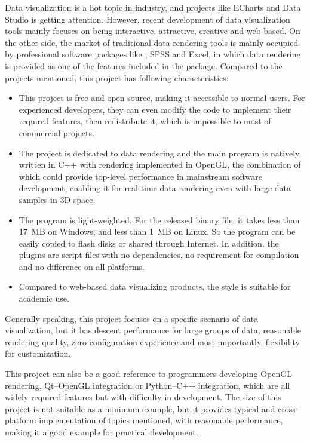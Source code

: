 Data visualization is a hot topic in industry, and projects like ECharts\cite{ref:echarts} and Data Studio\cite{ref:datastudio} is getting attention. However, recent development of data visualization tools mainly focuses on being interactive, attractive, creative and web based. On the other side, the market of traditional data rendering tools is mainly occupied by professional software packages like \MatLab{}, SPSS and Excel, in which data rendering is provided as one of the features included in the package. Compared to the projects mentioned, this project has following characteristics:
%
\begin{itemize}
	\item This project is free and open source, making it accessible to normal users. For experienced developers, they can even modify the code to implement their required features, then redistribute it, which is impossible to most of commercial projects.
	\item The project is dedicated to data rendering and the main program is natively written in C++ with rendering implemented in OpenGL, the combination of which could provide top-level performance in mainstream software development, enabling it for real-time data rendering even with large data samples in 3D space.
	\item The program is light-weighted. For the released binary file, it takes less than \SI{17}{MB} on Windows, and less than \SI{1}{MB} on Linux. So the program can be easily copied to flash disks or shared through Internet. In addition, the plugins are script files with no dependencies, no requirement for compilation and no difference on all platforms.
	\item Compared to web-based data visualizing products, the style is suitable for academic use.
\end{itemize}


Generally speaking, this project focuses on a specific scenario of data visualization, but it has descent performance for large groups of data, reasonable rendering quality, zero-configuration experience and most importantly, flexibility for customization.

This project can also be a good reference to programmers developing OpenGL rendering, Qt--OpenGL integration or Python--C++ integration, which are all widely required features but with difficulty in development. The size of this project is not suitable as a minimum example, but it provides typical and cross-platform implementation of topics mentioned, with reasonable performance, making it a good example for practical development.

